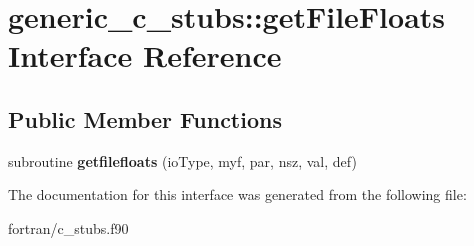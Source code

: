\hypertarget{interfacegeneric__c__stubs_1_1get_file_floats}{}\section{generic\+\_\+c\+\_\+stubs\+:\+:get\+File\+Floats Interface Reference}
\label{interfacegeneric__c__stubs_1_1get_file_floats}
\subsection*{Public Member Functions}
\begin{DoxyCompactItemize}
\item 
\mbox{\label{interfacegeneric__c__stubs_1_1get_file_floats_a523efbf8403d1c29ce4edd22c0630bfe}} 
subroutine {\bfseries getfilefloats} (io\+Type, myf, par, nsz, val, def)
\end{DoxyCompactItemize}


The documentation for this interface was generated from the following file\+:\begin{DoxyCompactItemize}
\item 
fortran/c\+\_\+stubs.\+f90\end{DoxyCompactItemize}
